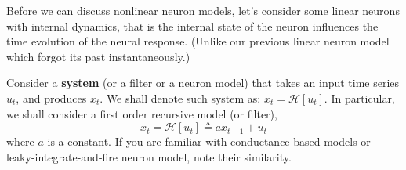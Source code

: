 \documentclass[letterpaper,11pt]{exam}
\newcommand{\system}[2]{\mathcal{#1}\left[ #2 \right]}
\begin{document}
\begin{questions}

\newpage
Before we can discuss nonlinear neuron models, let's consider some linear neurons with internal dynamics, that is the internal state of the neuron influences the time evolution of the neural response. (Unlike our previous linear neuron model which forgot its past instantaneously.)

\question Consider a \textbf{system} (or a filter or a neuron model) that takes an input time series $u_t$, and produces $x_t$. We shall denote such system as: $x_t = \system{H}{u_t}$. In particular, we shall consider a first order recursive model (or filter),
\begin{equation}\label{eq:filter:1}
    x_t = \system{H}{u_t} \triangleq a x_{t-1} + u_t
\end{equation}
where $a$ is a constant.
If you are familiar with conductance based models or leaky-integrate-and-fire neuron model, note their similarity.



\end{questions}
\end{document}
